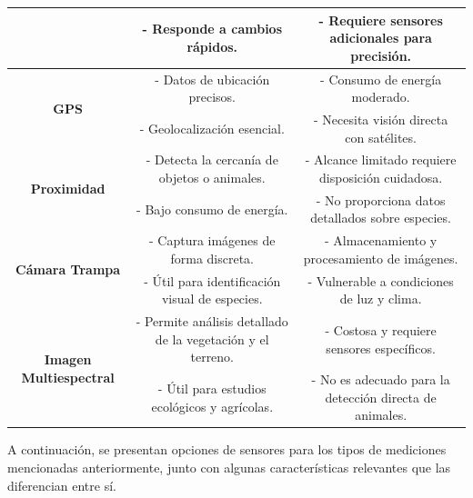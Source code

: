 \begin{table}[]
{\begin{tabular}{|c|c|c|}
 & - Responde   a cambios rápidos. & - Requiere sensores adicionales para precisión. \\ \hline
\multirow{2}{*}{\textbf{GPS}} & - Datos de ubicación precisos. & - Consumo de energía moderado. \\
 & -   Geolocalización esencial. & - Necesita visión directa con satélites. \\ \hline
\multirow{2}{*}{\textbf{Proximidad}} & - Detecta la cercanía de objetos o animales. & - Alcance limitado requiere disposición   cuidadosa. \\
 & - Bajo   consumo de energía. & - No proporciona datos detallados sobre   especies. \\ \hline
\multirow{2}{*}{\textbf{Cámara Trampa}} & - Captura imágenes de forma discreta. & - Almacenamiento y procesamiento de imágenes. \\
 & - Útil para   identificación visual de especies. & - Vulnerable a condiciones de luz y clima. \\ \hline
\multirow{2}{*}{\textbf{Imagen Multiespectral}} & - Permite análisis detallado de la vegetación y   el terreno. & - Costosa y requiere sensores específicos. \\
 & - Útil para   estudios ecológicos y agrícolas. & - No es adecuado para la detección directa de   animales. \\ \hline
\end{tabular}%
}
\end{table}

\newpage



\noindent A continuación, se presentan opciones de sensores para los tipos de mediciones mencionadas anteriormente, junto con algunas características relevantes que las diferencian entre sí.

